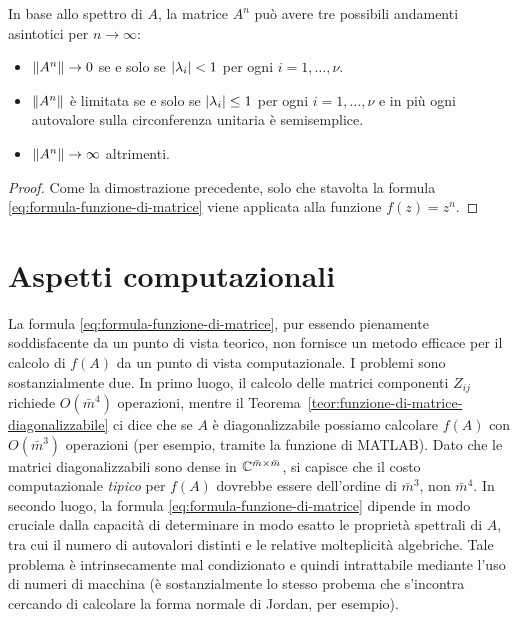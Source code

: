 \begin{teor} \label{teor:andamento-asintotico-potenza-matrice}
In base allo spettro di $A$, la matrice $A^n$ può avere tre possibili
andamenti asintotici per $n \to \infty$:
\begin{itemize}
\item $\left\lVert A^n\right\rVert \to 0$ se e solo se $\left\lvert\lambda_i\right\rvert < 1$ per ogni
	$i = 1,\dots,\nu$.
\item $\left\lVert A^n\right\rVert$ è limitata se e solo se $\left\lvert\lambda_i\right\rvert \leq 1$ per ogni
	$i = 1,\dots,\nu$ e in più ogni autovalore sulla circonferenza unitaria è semisemplice.
\item $\left\lVert A^n\right\rVert \to \infty$ altrimenti.
\end{itemize}
\end{teor}

\begin{proof}
Come la dimostrazione precedente, solo che stavolta la formula
\eqref{eq:formula-funzione-di-matrice} viene applicata alla funzione $f(z) = z^n$.
\end{proof}

\section{Aspetti computazionali}

La formula \eqref{eq:formula-funzione-di-matrice}, pur essendo pienamente
soddisfacente da un punto di vista teorico, non fornisce un metodo
efficace per il calcolo di $f(A)$ da un punto di vista computazionale.
I problemi sono sostanzialmente due. In primo luogo, il calcolo delle
matrici componenti $Z_{ij}$ richiede $O(\bar{m}^4)$ operazioni,
mentre il Teorema~\ref{teor:funzione-di-matrice-diagonalizzabile}
ci dice che se $A$ è diagonalizzabile possiamo calcolare $f(A)$
con $O(\bar{m}^3)$ operazioni (per esempio, tramite la funzione  di MATLAB).
Dato che le matrici diagonalizzabili sono dense in $\mathbb{C}^{\bar{m}\times\bar{m}}$,
si capisce che il costo computazionale \emph{tipico} per $f(A)$ dovrebbe
essere dell'ordine di $\bar{m}^3$, non $\bar{m}^4$.
In secondo luogo, la formula \eqref{eq:formula-funzione-di-matrice}
dipende in modo cruciale dalla capacità di determinare in modo esatto
le proprietà spettrali di $A$, tra cui il numero di autovalori distinti
e le relative molteplicità algebriche. Tale problema è intrinsecamente
mal condizionato e quindi intrattabile mediante l'uso di numeri di macchina
(è sostanzialmente lo stesso probema che s'incontra cercando di calcolare
la forma normale di Jordan, per esempio).

